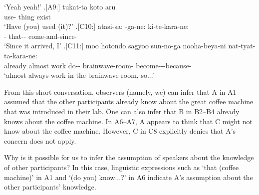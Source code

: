            `Yeah yeah!'
 \bg.[A9:] tukat-ta koto aru \\
        use- thing exist \\
        `Have (you) used (it)?'
 \bg.[C10:] atasi-sa: -ga-ne: ki-te-kara-ne: \\
         - that-- come-and-since- \\
         `Since it arrived, I'
 \bg.[C11:] moo hotondo sagyoo sun-no-ga nooha-beya-ni nat-tyat-ta-kara-ne: \\
           already almost work do-- brainwave-room- become---because- \\
           `almost always work in the brainwave room, so...'

From this short conversation,
observers (namely, we) can infer that
A in A1 assumed that the other participants already know about the great coffee machine that was introduced in their lab.
One can also infer that B in B2--B4 already knows about the coffee machine.
In A6--A7,
A appears to think that C might not know about the coffee machine.
However, C in C8 explicitly denies that A's concern does not apply.

Why is it possible for us to infer the assumption of speakers about the knowledge of other participants?
In this case, linguistic expressions such as
 `that (coffee machine)' in A1 and
 `(do you) know...?' in A6
indicate A's assumption about the other participants' knowledge.

